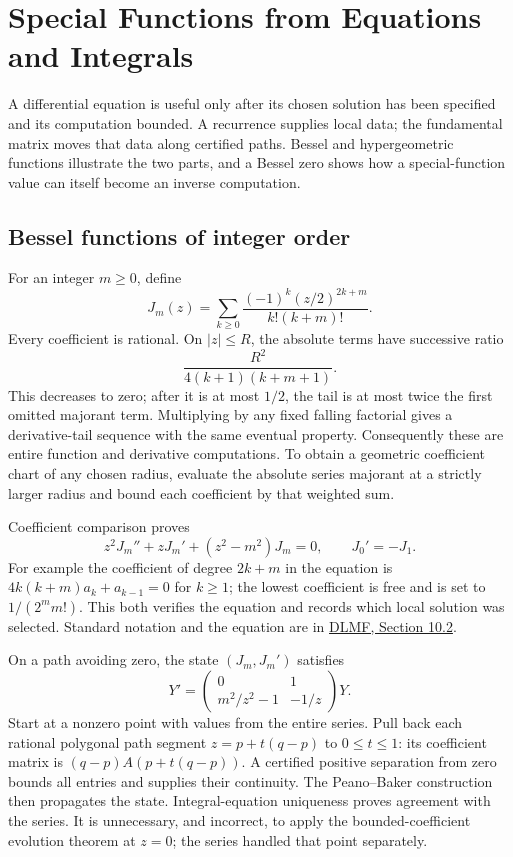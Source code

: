 \chapter{Special Functions from Equations and Integrals}
\label{ch:special-equations}

A differential equation is useful only after its chosen solution has been
specified and its computation bounded.  A recurrence supplies local data;
the fundamental matrix moves that data along certified paths.  Bessel
and hypergeometric functions illustrate the two parts, and a Bessel zero
shows how a special-function value can itself become an inverse computation.

\section{Bessel functions of integer order}
For an integer $m\ge0$, define
\[
 J_m(z)=\sum_{k\ge0}\frac{(-1)^k(z/2)^{2k+m}}{k!(k+m)!}.
\]
Every coefficient is rational.  On $|z|\le R$, the absolute terms have
successive ratio
\[
 \frac{R^2}{4(k+1)(k+m+1)}.
\]
This decreases to zero; after it is at most $1/2$, the tail is at most
twice the first omitted majorant term.  Multiplying by any fixed falling
factorial gives a derivative-tail sequence with the same eventual property.
Consequently these are entire function and derivative computations.  To
obtain a geometric coefficient chart of any chosen radius, evaluate the
absolute series majorant at a strictly larger radius and bound each
coefficient by that weighted sum.

Coefficient comparison proves
\[
 z^2J_m''+zJ_m'+(z^2-m^2)J_m=0,
 \qquad J_0'=-J_1.
\]
For example the coefficient of degree $2k+m$ in the equation is
$4k(k+m)a_k+a_{k-1}=0$ for $k\ge1$; the lowest coefficient is free
and is set to $1/(2^m m!)$.  This both verifies the equation and records
which local solution was selected.  Standard notation and the equation
are in \href{https://dlmf.nist.gov/10.2}{DLMF, Section 10.2}.

On a path avoiding zero, the state $(J_m,J_m')$ satisfies
\[
 Y'=\begin{pmatrix}0&1\\m^2/z^2-1&-1/z\end{pmatrix}Y.
\]
Start at a nonzero point with values from the entire series.  Pull back
each rational polygonal path segment $z=p+t(q-p)$ to $0\le t\le1$:
its coefficient matrix is $(q-p)A(p+t(q-p))$.  A certified positive
separation from zero bounds all entries and supplies their continuity.
The Peano--Baker construction then propagates the state.  Integral-equation
uniqueness proves agreement with the series.  It is unnecessary, and
incorrect, to apply the bounded-coefficient evolution theorem at $z=0$;
the series handled that point separately.

